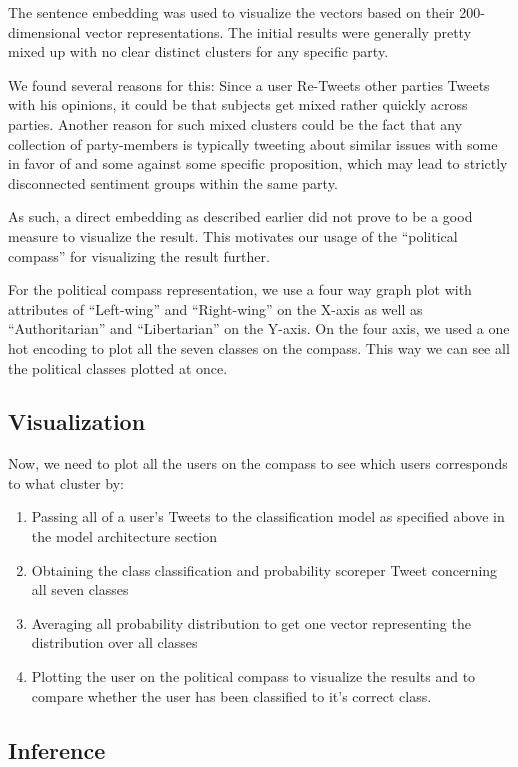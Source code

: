 \documentclass[10pt, oneside]{article}
\begin{document}
\begin{multicols}{2}
The sentence embedding was used to visualize the vectors based on their 200-dimensional vector representations. The initial results were generally pretty mixed up with no clear distinct clusters for any specific party.

We found several reasons for this:
Since a user Re-Tweets other parties Tweets with his opinions, it could be that subjects get mixed rather quickly across parties.
Another reason for such mixed clusters could be the fact that any collection of party-members is typically tweeting about similar issues with some in favor of and some against some specific proposition, which may lead to strictly disconnected sentiment groups within the same party.

As such, a direct embedding as described earlier did not prove to be a good measure to visualize the result. This motivates our usage of the ``political compass'' \cite{PoliticalCompass} for visualizing the result further. 

For the political compass representation, we use a four way graph plot with attributes of ``Left-wing'' and ``Right-wing'' on the X-axis as well as  ``Authoritarian'' and ``Libertarian'' on the Y-axis. On the four axis, we used a one hot encoding to plot all the seven classes on the compass. This way we can see all the political classes plotted at once.

\subsection{Visualization}

Now, we need to plot all the users on the compass to see which users corresponds to what cluster by:
\begin{enumerate}
	\item Passing all of a user's Tweets to the classification model as specified above in the model architecture section
	\item Obtaining the class classification and probability scoreper Tweet concerning all seven classes
	\item Averaging all probability distribution to get one vector representing the distribution over all classes
	\item Plotting the user on the political compass to visualize the results and to compare whether the user has been classified to it’s correct class.
\end{enumerate}

\subsection{Inference}


\end{multicols}
\end{document}
